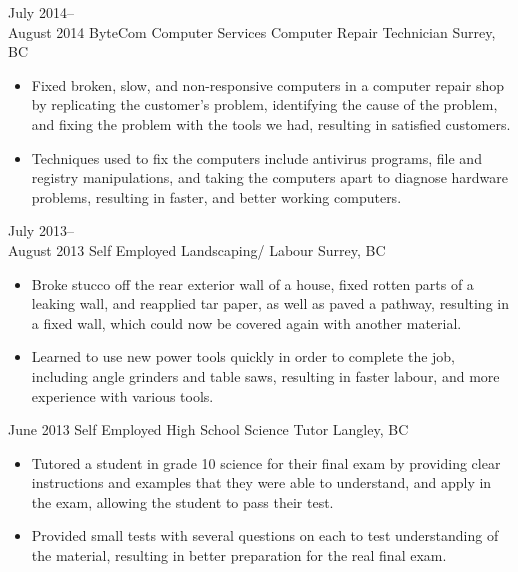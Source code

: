\documentclass[]{friggeri-cv} %
\begin{document}
\begin{entrylist}

\entry
{July 2014--\\August 2014}
{ByteCom Computer Services {\normalfont Computer Repair Technician}}
{Surrey, BC}
{
\begin{itemize}
\item Fixed broken, slow, and non-responsive computers in a computer repair shop by
replicating the customer’s
problem, identifying the cause of the problem, and fixing the problem with the
tools we had, resulting in satisfied
customers.
\item Techniques used to fix the computers include antivirus programs, file and
registry manipulations, and taking the
computers apart to diagnose hardware problems, resulting in faster, and better
working computers.
\end{itemize}
}

\entry
{July 2013--\\August 2013}
{Self Employed {\normalfont Landscaping/ Labour}}
{Surrey, BC}
{
\begin{itemize}
\item Broke stucco off the rear exterior wall of a house, fixed rotten parts of a
leaking wall, and reapplied tar paper, as
well as paved a pathway, resulting in a fixed wall, which could now be covered
again with another material.
\item Learned to use new power tools quickly in order to complete the job, including
angle grinders and table saws,
resulting in faster labour, and more experience with various tools.
\end{itemize}
}
\entry
{June 2013}
{Self Employed {\normalfont High School Science Tutor}}
{Langley, BC}
{
\begin{itemize}
\item Tutored a student in grade 10 science for their final exam by providing clear
instructions and examples that they
were able to understand, and apply in the exam, allowing the student to pass
their test.
\item Provided small tests with several questions on each to test understanding of
the material, resulting in better
preparation for the real final exam.
\end{itemize}
}
\end{entrylist}

\end{document}

